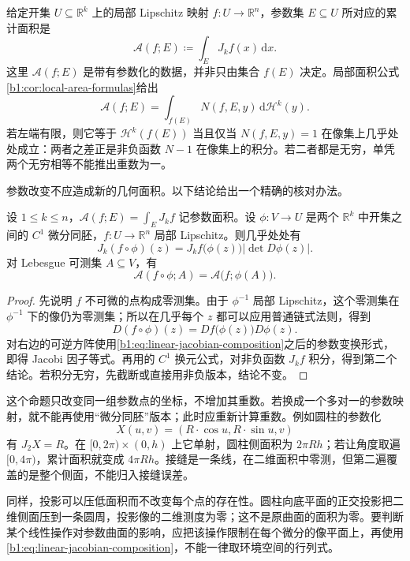 给定开集 \(U\subseteq\mathbb R^k\) 上的局部 Lipschitz 映射 \(f:U\to\mathbb R^n\)，参数集 \(E\subseteq U\) 所对应的累计面积是
\[
 \mathcal A(f;E)\coloneqq\int_EJ_kf(x)\,\mathrm dx.
\]
这里 \(\mathcal A(f;E)\) 是带有参数化的数据，并非只由集合 \(f(E)\) 决定。局部面积公式\cref{b1:cor:local-area-formulas}给出
\[
 \mathcal A(f;E)=\int_{f(E)}N(f,E,y)\,\mathrm d\mathcal H^k(y).
\]
若左端有限，则它等于 \(\mathcal H^k(f(E))\) 当且仅当 \(N(f,E,y)=1\) 在像集上几乎处处成立：两者之差正是非负函数 \(N-1\) 在像集上的积分。若二者都是无穷，单凭两个无穷相等不能推出重数为一。

\ProseParagraphBreak

参数改变不应造成新的几何面积。以下结论给出一个精确的核对办法。

\begin{proposition}\label{b1:prop:area-reparameterization}
设 \(1\le k\le n\)，\(\mathcal A(f;E)=\int_EJ_kf\) 记参数面积。设 \(\phi:V\to U\) 是两个 \(\mathbb R^k\) 中开集之间的 \(C^1\) 微分同胚，\(f:U\to\mathbb R^n\) 局部 Lipschitz。则几乎处处有
\[
 J_k(f\circ\phi)(z)=J_kf\bigl(\phi(z)\bigr)|\det D\phi(z)|.
\]
对 Lebesgue 可测集 \(A\subseteq V\)，有
\[
 \mathcal A(f\circ\phi;A)=\mathcal A\bigl(f;\phi(A)\bigr).
\]
\end{proposition}
\begin{proof}
先说明 \(f\) 不可微的点构成零测集。由于 \(\phi^{-1}\) 局部 Lipschitz，这个零测集在 \(\phi^{-1}\) 下的像仍为零测集；所以在几乎每个 \(z\) 都可以应用普通链式法则，得到
\[
 D(f\circ\phi)(z)=Df\bigl(\phi(z)\bigr)D\phi(z).
\]
对右边的可逆方阵使用\eqref{b1:eq:linear-jacobian-composition}之后的参数变换形式，即得 Jacobi 因子等式。再用的 \(C^1\) 换元公式，对非负函数 \(J_kf\) 积分，得到第二个结论。若积分无穷，先截断或直接用非负版本，结论不变。
\end{proof}

这个命题只改变同一组参数点的坐标，不增加其重数。若换成一个多对一的参数映射，就不能再使用“微分同胚”版本；此时应重新计算重数。例如圆柱的参数化
\[
 X(u,v)=(R\cdot \cos u,R\cdot \sin u,v)
\]
有 \(J_2X=R\)。在 \([0,2\pi)\times(0,h)\) 上它单射，圆柱侧面积为 \(2\pi Rh\)；若让角度取遍 \([0,4\pi)\)，累计面积就变成 \(4\pi Rh\)。接缝是一条线，在二维面积中零测，但第二遍覆盖的是整个侧面，不能归入接缝误差。

\ProseParagraphBreak

同样，投影可以压低面积而不改变每个点的存在性。圆柱向底平面的正交投影把二维侧面压到一条圆周，投影像的二维测度为零；这不是原曲面的面积为零。要判断某个线性操作对参数曲面的影响，应把该操作限制在每个微分的像平面上，再使用\eqref{b1:eq:linear-jacobian-composition}，不能一律取环境空间的行列式。

